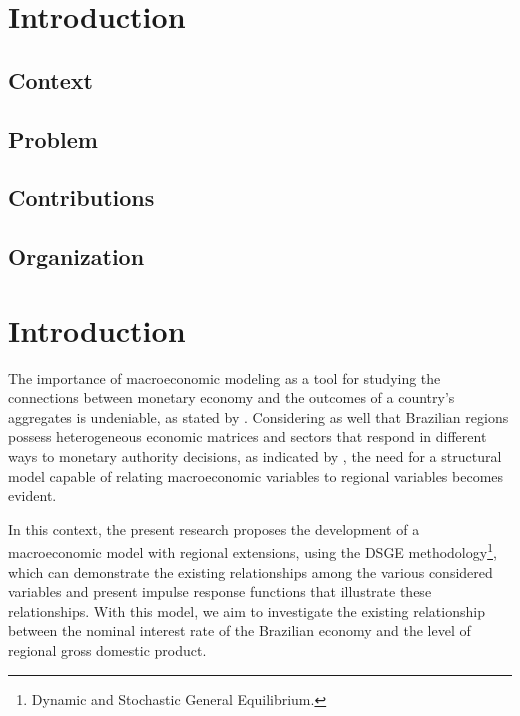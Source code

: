 \documentclass[
thesis.tex
]{subfiles}
\begin{document}
	\newpage
	
	\section{Introduction}
	
	\subsection*{Context}
	
	\subsection*{Problem}
	
	\subsection*{Contributions}
	
	\subsection*{Organization}
	
	
	
	\section{Introduction}\label{sec:introduction}

	The importance of macroeconomic modeling as a tool for studying the connections between monetary economy and the outcomes of a country's aggregates is undeniable, as stated by \textcite{gali_monetary_2015}. Considering as well that Brazilian regions possess heterogeneous economic matrices and sectors that respond in different ways to monetary authority decisions, as indicated by \textcite{bertanha_efeitos_2008}, the need for a structural model capable of relating macroeconomic variables to regional variables becomes evident.
	
	In this context, the present research proposes the development of a macroeconomic model with regional extensions, using the DSGE methodology\footnote{Dynamic and Stochastic General Equilibrium.}, which can demonstrate the existing relationships among the various considered variables and present impulse response functions that illustrate these relationships. With this model, we aim to investigate the existing relationship between the nominal interest rate of the Brazilian economy and the level of regional gross domestic product.
	
\end{document}
